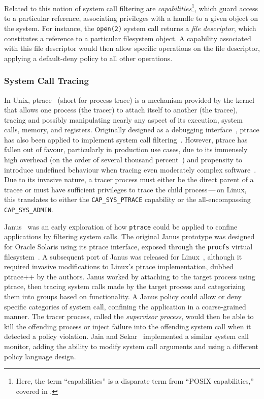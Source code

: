 \documentclass[
  fontsize=12pt,
  titlepage=firstiscover,
  paper=letter,
oneside,
  cleardoublepage=plain,
  parskip=half-,
  DIV=10,
  parindent,
  appendixprefix,
  chapterprefix,
  listof=totoc,
]{scrbook}
\begin{document}
Related to this notion of system call filtering are \textit{capabilities}\footnote{Here,
the term \enquote{capabilities} is a disparate term from \enquote{POSIX capabilities,}
covered in .}, which guard access to a particular reference, associating
privileges with a handle to a given object on the system. For instance, the
\texttt{open(2)} system call returns a \textit{file descriptor}, which constitutes
a reference to a particular filesystem object. A capability associated with this file
descriptor would then allow specific operations on the file descriptor, applying
a default-deny policy to all other operations.

\subsubsection*{System Call Tracing}
\label{sss:ptrace}

In Unix, ptrace~\cite{ptrace, padala2002_ptrace} (short for process trace) is a mechanism
provided by the kernel that allows one process (the tracer) to attach itself to another
(the tracee), tracing and possibly manipulating nearly any aspect of its execution, system
calls, memory, and registers. Originally designed as a debugging interface~\cite{ptrace,
padala2002_ptrace}, ptrace has also been applied to implement system call
filtering~\cite{goldberg96_janus, wagner1999_janus, jain2000_filtering}. However, ptrace
has fallen out of favour, particularly in production use cases, due to its immensely high
overhead (on the order of several thousand percent~\cite{zinke2009_overhead}) and
propensity to introduce undefined behaviour when tracing even moderately complex
software~\cite{swiecki2017_promises}. Due to its invasive nature, a tracer process must
either be the direct parent of a tracee or must have sufficient privileges to trace the
child process\,---\,on Linux, this translates to either the \texttt{CAP\_SYS\_PTRACE}
capability or the all-encompassing \texttt{CAP\_SYS\_ADMIN}.

Janus~\cite{goldberg96_janus, wagner1999_janus} was an early exploration of how
\texttt{ptrace} could be applied to confine applications by filtering system calls.  The
original Janus prototype was designed for Oracle Solaris using its ptrace interface,
exposed through the \texttt{procfs} virtual filesystem~\cite{goldberg96_janus}.
A subsequent port of Janus was released for Linux~\cite{wagner1999_janus}, although it
required invasive modifications to Linux's ptrace implementation, dubbed ptrace++ by the
authors. Janus worked by attaching to the target process using ptrace, then tracing system
calls made by the target process and categorizing them into groups based on functionality.
A Janus policy could allow or deny specific categories of system call, confining the
application in a coarse-grained manner. The tracer process, called the \textit{supervisor
process}, would then be able to kill the offending process or inject failure into the
offending system call when it detected a policy violation.  Jain and
Sekar~\cite{jain2000_filtering} implemented a similar system call monitor, adding the
ability to modify system call arguments and using a different policy language design.
\end{document}
